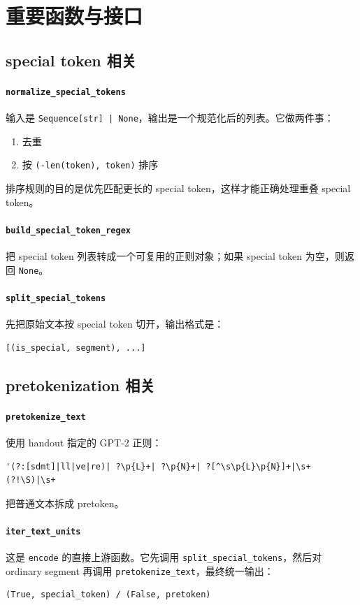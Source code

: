 \documentclass[11pt,a4paper]{ctexart}
\begin{document}
\section{重要函数与接口}
\subsection{special token 相关}
\paragraph{\texttt{normalize\_special\_tokens}}
输入是 \texttt{Sequence[str] | None}，输出是一个规范化后的列表。它做两件事：
\begin{enumerate}[leftmargin=2em]
  \item 去重
  \item 按 \texttt{(-len(token), token)} 排序
\end{enumerate}

排序规则的目的是优先匹配更长的 special token，这样才能正确处理重叠 special token。

\paragraph{\texttt{build\_special\_token\_regex}}
把 special token 列表转成一个可复用的正则对象；如果 special token 为空，则返回 \texttt{None}。

\paragraph{\texttt{split\_special\_tokens}}
先把原始文本按 special token 切开，输出格式是：
\begin{lstlisting}
[(is_special, segment), ...]
\end{lstlisting}

\subsection{pretokenization 相关}
\paragraph{\texttt{pretokenize\_text}}
使用 handout 指定的 GPT-2 正则：
\begin{lstlisting}
'(?:[sdmt]|ll|ve|re)| ?\p{L}+| ?\p{N}+| ?[^\s\p{L}\p{N}]+|\s+(?!\S)|\s+
\end{lstlisting}
把普通文本拆成 pretoken。

\paragraph{\texttt{iter\_text\_units}}
这是 \texttt{encode} 的直接上游函数。它先调用 \texttt{split\_special\_tokens}，然后对 ordinary segment 再调用 \texttt{pretokenize\_text}，最终统一输出：
\begin{lstlisting}
(True, special_token) / (False, pretoken)
\end{lstlisting}
\end{document}
